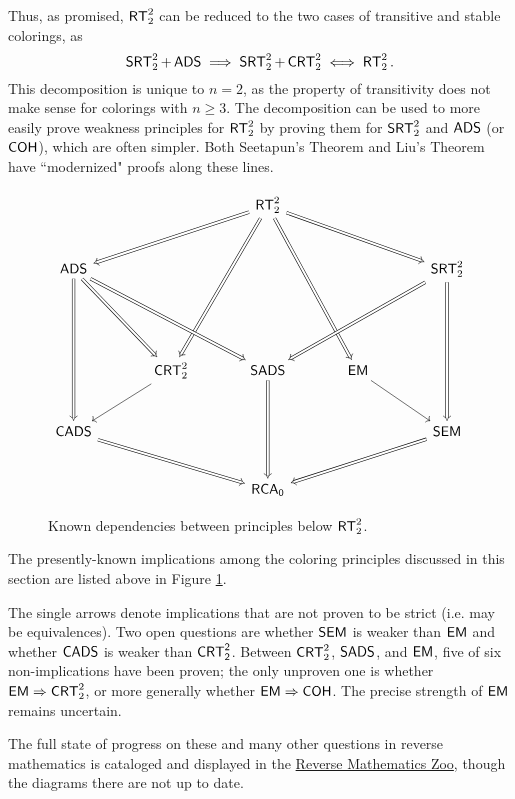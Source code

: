 \documentclass{amsart}
\begin{document}
	Thus, as promised, $\operatorname{\sf{RT}}^2_2$ can be reduced to the two cases of transitive and stable colorings, as
	$$
	\operatorname{\sf{SRT}}^2_2 + \operatorname{\sf{ADS}} \implies \operatorname{\sf{SRT}}^2_2 + \operatorname{\sf{CRT}}^2_2 \iff \operatorname{\sf{RT}}^2_2.
	$$
	This decomposition is unique to $n=2$, as the property of transitivity does not make sense for colorings with $n\geq 3$. The decomposition can be used to more easily prove weakness principles for $\operatorname{\sf{RT}}^2_2$ by proving them for $\operatorname{\sf{SRT}}^2_2$ and $\operatorname{\sf{ADS}}$ (or $\operatorname{\sf{COH}}$), which are often simpler. Both Seetapun's Theorem and Liu's Theorem have ``modernized" proofs along these lines.
	
	\begin{figure}[h]
		$$\begin{tikzcd}[sep=large]
			&& {\RT^2_2} \\
			{\sf{ADS}} &&&& {\SRT^2_2} \\
			\\
			& {\CRT^2_2} & {\sf{SADS}} & {\sf{EM}} \\
			{\sf{CADS}} &&&& {\sf{SEM}} \\
			&& {\sf{RCA_0}}
			\arrow[Rightarrow, from=1-3, to=2-1]
			\arrow[Rightarrow, from=1-3, to=2-5]
			\arrow[Rightarrow, from=1-3, to=4-2]
			\arrow[Rightarrow, from=1-3, to=4-4]
			\arrow[Rightarrow, from=2-1, to=4-2]
			\arrow[Rightarrow, from=2-1, to=4-3]
			\arrow[Rightarrow, from=2-1, to=5-1]
			\arrow[Rightarrow, from=2-5, to=4-3]
			\arrow[Rightarrow, from=2-5, to=5-5]
			\arrow[from=4-2, to=5-1]
			\arrow[Rightarrow, from=4-3, to=6-3]
			\arrow[from=4-4, to=5-5]
			\arrow[Rightarrow, from=5-1, to=6-3]
			\arrow[Rightarrow, from=5-5, to=6-3]
		\end{tikzcd}$$
		\caption{Known dependencies between principles below $\operatorname{\sf{RT}}^2_2$.}
		\label{fig:last}
	\end{figure}
	
	The presently-known implications among the coloring principles discussed in this section are listed above in Figure \ref{fig:last}.
	
	The single arrows denote implications that are not proven to be strict (i.e. may be equivalences). Two open questions are whether $\sf{SEM}$ is weaker than $\operatorname{\sf{EM}}$ and whether $\sf{CADS}$ is weaker than $\sf{CRT}^2_2$. Between $\operatorname{\sf{CRT}}^2_2$, $\operatorname{\sf{SADS}}$, and $\operatorname{\sf{EM}}$, five of six non-implications have been proven; the only unproven one is whether $\operatorname{\sf{EM}}\Rightarrow \operatorname{\sf{CRT}}^2_2$, or more generally whether $\operatorname{\sf{EM}}\Rightarrow \operatorname{\sf{COH}}$. The precise strength of $\operatorname{\sf{EM}}$ remains uncertain.
	
	The full state of progress on these and many other questions in reverse mathematics is cataloged and displayed in the \href{https://rmzoo.math.uconn.edu/diagrams/}{Reverse Mathematics Zoo}, though the diagrams there are not up to date.\\
	
\end{document}
